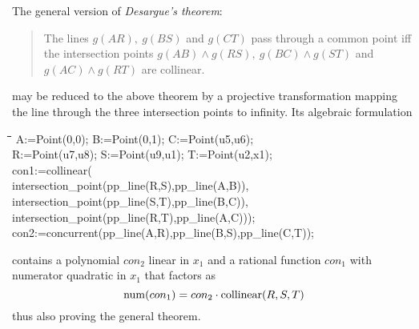 \documentclass{article}
\newenvironment{code}{\tt \begin{tabbing}
\hspace*{1cm}\=\hspace*{1cm}\=\hspace*{1cm}\=
\hspace*{1cm}\=\hspace*{1cm}\=\kill
}{\end{tabbing}}
\begin{document}
The general version of {\em Desargue's theorem}:
\begin{quote}
The lines $g(AR),\ g(BS)$ and $g(CT)$ pass through a common point iff
the intersection points $g(AB)\wedge g(RS),\ g(BC)\wedge g(ST)$ and
$g(AC)\wedge g(RT)$ are collinear.
\end{quote}
may be reduced to the above theorem by a projective transformation
mapping the line through the three intersection points to infinity.
Its algebraic formulation
\begin{code}\>\+
A:=Point(0,0); B:=Point(0,1); C:=Point(u5,u6);\\
R:=Point(u7,u8); S:=Point(u9,u1); T:=Point(u2,x1);\\[6pt]
con1:=collinear(\+\\intersection\_point(pp\_line(R,S),pp\_line(A,B)),\\
	intersection\_point(pp\_line(S,T),pp\_line(B,C)),\\
	intersection\_point(pp\_line(R,T),pp\_line(A,C)));\-\\

con2:=concurrent(pp\_line(A,R),pp\_line(B,S),pp\_line(C,T));
\end{code}
contains a polynomial $con_2$ linear in $x_1$ and a rational function
$con_1$ with numerator quadratic in $x_1$ that factors as
\[{\rm num}(con_1)=con_2\cdot {\rm collinear}(R,S,T)\]
thus also proving the general theorem.
\medskip
\end{document}
